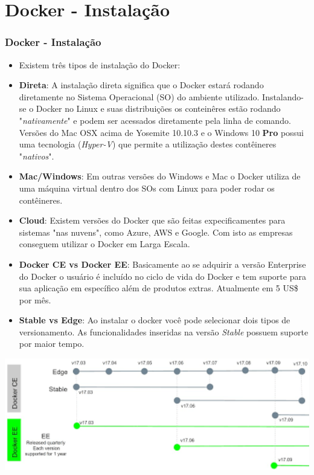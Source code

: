 \documentclass[10pt]{beamer}
\theoremstyle{remark}
\theoremstyle{definition}
\begin{document}
\section{Docker - Instalação}
\begin{frame}[allowframebreaks]
\frametitle{Docker - Instalação}

	\begin{itemize}
	\item Existem três tipos de instalação do Docker:
	
	\item \textbf{Direta}: A instalação direta significa que o Docker estará rodando diretamente no Sistema Operacional (SO) do ambiente utilizado. Instalando-se o Docker no Linux e suas distribuições os conteinêres estão rodando "\textit{nativamente}" e podem ser acessados diretamente pela linha de comando. Versões do Mac OSX acima de Yosemite 10.10.3 e o Windows 10 \textbf{Pro} possui uma tecnologia (\textit{Hyper-V}) que permite a utilização destes contêineres "\textit{nativos}". 
	
	\item \textbf{Mac/Windows}: Em outras versões do Windows e Mac o Docker utiliza de uma máquina virtual dentro dos SOs com Linux para poder rodar os contêineres.
	
	\item \textbf{Cloud}: Existem versões do Docker que são feitas expecificamentes para sistemas "nas nuvens", como Azure, AWS e Google. Com isto as empresas conseguem utilizar o Docker em Larga Escala.
	\end{itemize}
	
	\framebreak
	
	\begin{itemize}
		\item \textbf{Docker CE vs Docker EE}: Basicamente ao se adquirir a versão Enterprise do Docker o usuário é incluído no ciclo de vida do Docker e tem suporte para sua aplicação em específico além de produtos extras. Atualmente em 5 US\$ por mês.
		
		\item \textbf{Stable vs Edge}: Ao instalar o docker você pode selecionar dois tipos de versionamento. As funcionalidades inseridas na versão \textit{Stable} possuem suporte por maior tempo.
		
	\end{itemize}
	
	\framebreak
	
	\includegraphics[width=1\textwidth]{images/02.png}
	

\end{frame}
\end{document}
